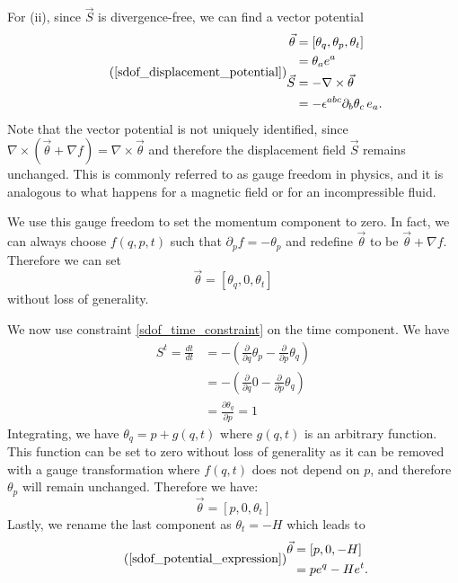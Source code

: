 \documentclass[fleqn,10pt]{wlscirep}
\begin{document}
For (ii), since $\vec{S}$ is divergence-free, we can find a vector potential
\begin{equation}
\tag*{(\ref{sdof_displacement_potential})}
	\begin{aligned}
		\vec{\theta} &= [\theta_q, \theta_p, \theta_t] \\
		&= \theta_a e^a \\
		\vec{S} &= - \nabla \times \vec{\theta} \\
		&= - \epsilon^{abc} \partial_b \theta_c \, e_a. \\
	\end{aligned}
\end{equation}
Note that the vector potential is not uniquely identified, since $\nabla \times(\vec{\theta} + \nabla f) = \nabla \times \vec{\theta}$ and therefore the displacement field $\vec{S}$ remains unchanged. This is commonly referred to as gauge freedom in physics, and it is analogous to what happens for a magnetic field or for an incompressible fluid.

We use this gauge freedom to set the momentum component to zero. In fact, we can always choose $f(q,p,t)$ such that $\partial_p f = -\theta_p$ and redefine $\vec{\theta}$ to be $\vec{\theta} + \nabla f$. Therefore we can set
\begin{equation}
	\vec{\theta} = [\theta_q, 0, \theta_t]
\end{equation}
without loss of generality.

We now use constraint \ref{sdof_time_constraint} on the time component. We have
\begin{align}
	S^t = \frac{dt}{dt} &= - \left(\frac{\partial}{\partial q}  \theta_p - \frac{\partial}{\partial p}  \theta_q\right) \\
	&= - \left(\frac{\partial}{\partial q}  0 - \frac{\partial}{\partial p}  \theta_q\right) \\
	& = \frac{\partial \theta_q}{\partial p} = 1
\end{align}
Integrating, we have $\theta_q = p + g(q,t)$ where $g(q,t)$ is an arbitrary function. This function can be set to zero without loss of generality as it can be removed with a gauge transformation where $f(q,t)$ does not depend on $p$, and therefore $\theta_p$ will remain unchanged. Therefore we have:
\begin{equation}
	\vec{\theta} = [p, 0, \theta_t]
\end{equation}
Lastly, we rename the last component as $\theta_t = -H$ which leads to 
\begin{equation}
\tag*{(\ref{sdof_potential_expression})}
	\begin{aligned}
		\vec{\theta} &= [p, 0, -H] \\
		&= p e^q - H e^t.
	\end{aligned}
\end{equation}
\end{document}
